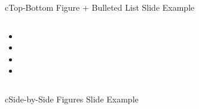 \begin{myslide}{c}{Top-Bottom Figure + Bulleted List Slide Example}


\begin{columns}

\begin{column}{1\textwidth}

\begin{itemize}

\item \lipsum[1][1-2]

\item \lipsum[1][3]

\item \lipsum[1][4-5]

\item \lipsum[1][6]

\end{itemize}

\end{column}

\end{columns}

\end{myslide}

\begin{myslide}{c}{Side-by-Side Figures Slide Example}

\begin{columns}



\end{columns}

\end{myslide}

